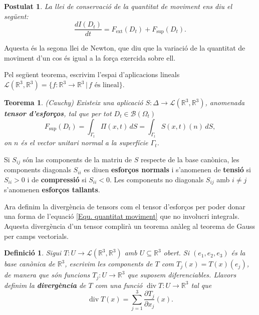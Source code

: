 \documentclass{article}
\numberwithin{equation}{section}
\DeclareMathOperator{\diver}{div}
\newtheorem{teorema}{Teorema}[section]
\newtheorem{definicio}{Definici\'{o}}[section]
\newtheorem{postulat}{Postulat}[section]
\begin{document}
\begin{postulat}\label{Pos: quantitat moviment}
La llei de conservaci\'{o} de la quantitat de moviment ens diu el seg\"{u}ent:
\begin{equation}\label{Equ. quantitat moviment}
\frac{dI(D_t)}{dt}=F_{\text{ext}}(D_t)+F_{\text{sup}}(D_t).
\end{equation}
\end{postulat}

Aquesta \'{e}s la segona llei de Newton, que diu que la variaci\'{o} de la quantitat de moviment d'un cos \'{e}s igual a la for\c{c}a exercida sobre ell.

Pel seg\"{u}ent teorema, escrivim l'espai d'aplicacions lineals $\mathcal{L}(\mathbb{R}^3,\mathbb{R}^3)=\{f:\mathbb{R}^3\rightarrow\mathbb{R}^3\,|\,f\text{ \'{e}s lineal}\}$.

\begin{teorema}
(Cauchy) Existeix una aplicaci\'{o} $S:\Delta\rightarrow\mathcal{L}(\mathbb{R}^3,\mathbb{R}^3)$, anomenada \textbf{tensor d'esfor\c{c}os}, tal que per tot $D_t\in\mathcal{B}(\Omega_t)$
\[F_{\text{sup}}(D_t)=\int_{\Gamma_t}\Pi(x,t)\,dS=\int_{\Gamma_t}S(x,t)(n)\,dS,\]
on $n$ \'{e}s el vector unitari normal a la superf\'{i}cie $\Gamma_t$.
\end{teorema}

Si $S_{ij}$ s\'{o}n las components de la matriu de $S$ respecte de la base can\`{o}nica, les components diagonals $S_{ii}$ es diuen \textbf{esfor\c{c}os normals} i s'anomenen de \textbf{tensi\'{o}} si $S_{ii}>0$ i de \textbf{compressi\'{o}} si $S_{ii}<0$. Les components no diagonals $S_{ij}$ amb $i\neq j$ s'anomenen \textbf{esfor\c{c}os tallants}.

Ara definim la diverg\`{e}ncia de tensors com el tensor d'esfor\c{c}os per poder donar una forma de l'equaci\'{o} \eqref{Equ. quantitat moviment} que no involucri integrals. Aquesta diverg\`{e}ncia d'un tensor complir\`{a} un teorema an\`{a}leg al teorema de Gauss per camps vectorials.

\begin{definicio}
Sigui $T:U\rightarrow\mathcal{L}(\mathbb{R}^3,\mathbb{R}^3)$ amb $U\subseteq\mathbb{R}^3$ obert. Si $(e_1,e_2,e_3)$ \'{e}s la base can\`{o}nica de $\mathbb{R}^3$, escrivim les components de $T$ com $T_j(x)=T(x)(e_j)$, de manera que s\'{o}n funcions $T_j:U\rightarrow\mathbb{R}^3$ que suposem diferenciables. Llavors definim la \textbf{diverg\`{e}ncia} de $T$ com una funci\'{o} $\diver T:U\rightarrow\mathbb{R}^3$ tal que
\begin{equation}
\diver T(x)=\sum_{j=1}^3\frac{\partial T_{j}}{\partial x_j}(x).
\end{equation}
\end{definicio}
\end{document}
